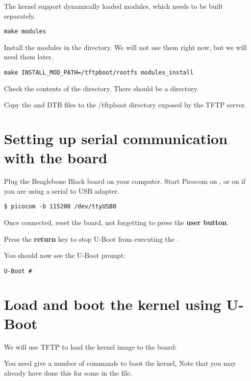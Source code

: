 The kernel support dynamically loaded modules, which needs to be built separately.

\begin{verbatim}
make modules
\end{verbatim}

Install the modules in the  directory.
We will not use them right now, but we will need them later.
 
\begin{verbatim}
make INSTALL_MOD_PATH=/tftpboot/rootfs modules_install
\end{verbatim}

Check the contents of the  directory. There should be a  directory.

Copy the  and DTB files to the /tftpboot directory exposed by the TFTP server.

\section{Setting up serial communication with the board}

Plug the Beaglebone Black board on your computer. Start Picocom on
, or on  if you are using a serial
to USB adapter.

\begin{verbatim}
$ picocom -b 115200 /dev/ttyUSB0
\end{verbatim}


Once connected, reset the board, not forgetting to press the {\bf user button}.

Press the {\bf return} key to stop U-Boot from executing the .

You should now see the U-Boot prompt:

\begin{verbatim}
U-Boot #
\end{verbatim}

\clearpage
\section{Load and boot the kernel using U-Boot}

We will use TFTP to load the kernel image to the \devboard board:

You need give a number of commands to boot the kernel, 
Note that you may already have done this for some in the  file.

